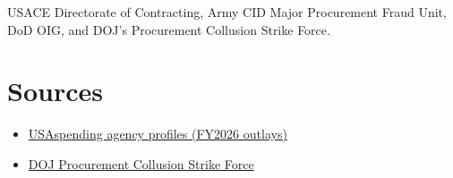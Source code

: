\documentclass[letterpaper,11pt]{article}
\providecommand{\tightlist}{\setlength{\itemsep}{0pt}\setlength{\parskip}{0pt}}
\begin{document}
USACE Directorate of Contracting, Army CID Major Procurement Fraud Unit,
DoD OIG, and DOJ's Procurement Collusion Strike Force.

\hypertarget{sources}{%
\section{Sources}\label{sources}}

\begin{itemize}
\tightlist
\item
  \href{https://www.usaspending.gov/agency}{USAspending agency profiles
  (FY2026 outlays)}
\item
  \href{https://www.justice.gov/atr/procurement-collusion-strike-force}{DOJ
  Procurement Collusion Strike Force}
\end{itemize}
\end{document}
